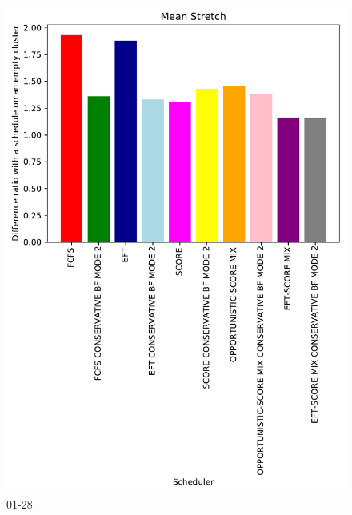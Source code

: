 \documentclass[a4paper]{article}
\begin{document}
\begin{figure}\includegraphics[width=0.9\linewidth]{MBSS/plot/Results_FCFS_Score_Backfill_2022-01-28->2022-01-28_V10000_Mean_Stretch_450_128_32_256_4_1024.pdf}\caption{01-28}\end{figure}
\end{document}
